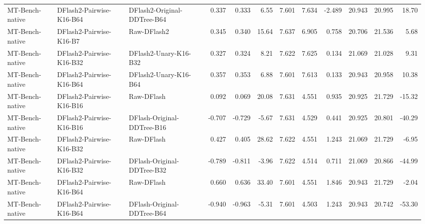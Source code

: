 \begin{longtable}{lllrrrrrrrrr}
MT-Bench-native & DFlash2-Pairwise-K16-B64 & DFlash2-Original-DDTree-B64 & 0.337 & 0.333 & 6.55 & 7.601 & 7.634 & -2.489 & 20.943 & 20.995 & 18.70 \\
MT-Bench-native & DFlash2-Pairwise-K16-B7 & Raw-DFlash2 & 0.345 & 0.340 & 15.64 & 7.637 & 6.905 & 0.758 & 20.706 & 21.536 & 5.68 \\
MT-Bench-native & DFlash2-Pairwise-K16-B32 & DFlash2-Unary-K16-B32 & 0.327 & 0.324 & 8.21 & 7.622 & 7.625 & 0.134 & 21.069 & 21.028 & 9.31 \\
MT-Bench-native & DFlash2-Pairwise-K16-B64 & DFlash2-Unary-K16-B64 & 0.357 & 0.353 & 6.88 & 7.601 & 7.613 & 0.133 & 20.943 & 20.958 & 10.38 \\
MT-Bench-native & DFlash2-Pairwise-K16-B16 & Raw-DFlash & 0.092 & 0.069 & 20.08 & 7.631 & 4.551 & 0.935 & 20.925 & 21.729 & -15.32 \\
MT-Bench-native & DFlash2-Pairwise-K16-B16 & DFlash-Original-DDTree-B16 & -0.707 & -0.729 & -5.67 & 7.631 & 4.529 & 0.441 & 20.925 & 20.801 & -40.29 \\
MT-Bench-native & DFlash2-Pairwise-K16-B32 & Raw-DFlash & 0.427 & 0.405 & 28.62 & 7.622 & 4.551 & 1.243 & 21.069 & 21.729 & -6.95 \\
MT-Bench-native & DFlash2-Pairwise-K16-B32 & DFlash-Original-DDTree-B32 & -0.789 & -0.811 & -3.96 & 7.622 & 4.514 & 0.711 & 21.069 & 20.866 & -44.99 \\
MT-Bench-native & DFlash2-Pairwise-K16-B64 & Raw-DFlash & 0.660 & 0.636 & 33.40 & 7.601 & 4.551 & 1.846 & 20.943 & 21.729 & -2.04 \\
MT-Bench-native & DFlash2-Pairwise-K16-B64 & DFlash-Original-DDTree-B64 & -0.940 & -0.963 & -5.31 & 7.601 & 4.503 & 1.243 & 20.943 & 20.742 & -53.30 \\
\end{longtable}


